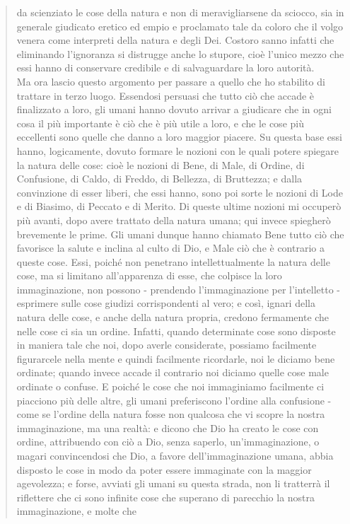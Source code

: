 \begin{quotation}
{	da scienziato le cose della natura e non di meravigliarsene da sciocco, sia in generale giudicato eretico ed empio e proclamato tale da coloro che il volgo venera come interpreti della
	natura e degli Dei. Costoro sanno infatti che eliminando l’ignoranza si distrugge anche lo
	stupore, cioè l’unico mezzo che essi hanno di conservare credibile e di salvaguardare la loro
	autorità.} \\
	Ma ora lascio questo argomento per passare a quello che ho stabilito di trattare in
	terzo luogo.
	Essendosi persuasi che tutto ciò che accade è finalizzato a loro, gli umani hanno dovuto
	arrivar a giudicare che in ogni cosa il più importante è ciò che è più utile a loro, e che le cose più eccellenti sono quelle che danno a loro maggior piacere. Su questa base essi hanno,
	logicamente, dovuto formare le nozioni con le quali potere spiegare la natura delle cose:
	cioè le nozioni di Bene, di Male, di Ordine, di Confusione, di Caldo, di Freddo, di Bellezza,
	di Bruttezza; e dalla convinzione di esser liberi, che essi hanno, sono poi sorte le nozioni di
	Lode e di Biasimo, di Peccato e di Merito. Di queste ultime nozioni mi occuperò più avanti,
	dopo avere trattato della natura umana; qui invece spiegherò brevemente le prime. Gli
	umani dunque hanno chiamato Bene tutto ciò che favorisce la salute e inclina al culto di
	Dio, e Male ciò che è contrario a queste cose. Essi, poiché non penetrano intellettualmente
	la natura delle cose, ma si limitano all’apparenza di esse, che colpisce la loro immaginazione, non possono - prendendo l’immaginazione per l’intelletto - esprimere sulle cose giudizi
	corrispondenti al vero; e così, ignari della natura delle cose, e anche della natura propria,
	credono fermamente che nelle cose ci sia un ordine. Infatti, quando determinate cose sono
	disposte in maniera tale che noi, dopo averle considerate, possiamo facilmente figurarcele
	nella mente e quindi facilmente ricordarle, noi le diciamo bene ordinate; quando invece accade il contrario noi diciamo quelle cose male ordinate o confuse. E poiché le cose che noi
	immaginiamo facilmente ci piacciono più delle altre, gli umani preferiscono l’ordine alla
	confusione - come se l’ordine della natura fosse non qualcosa che vi scopre la nostra immaginazione, ma una realtà: e dicono che Dio ha creato le cose con ordine, attribuendo con
	ciò a Dio, senza saperlo, un’immaginazione, o magari convincendosi che Dio, a favore
	dell’immaginazione umana, abbia disposto le cose in modo da poter essere immaginate con
	la maggior agevolezza; e forse, avviati gli umani su questa strada, non li tratterrà il riflettere che ci sono infinite cose che superano di parecchio la nostra immaginazione, e molte che

\end{quotation}

